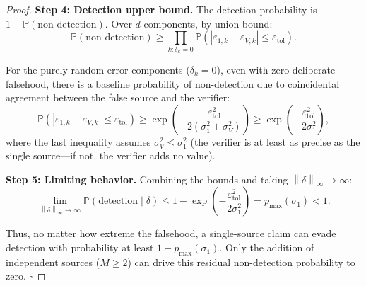 \documentclass[11pt,a4paper]{article}
\theoremstyle{definition}
\newcommand{\Pbb}{\mathbb{P}}
\newcommand{\norm}[1]{\left\lVert#1\right\rVert}
\newcommand{\abs}[1]{\left|#1\right|}
\begin{document}
\begin{proof}
\textbf{Step 4: Detection upper bound.} The detection probability is $1 - \Pbb(\text{non-detection})$. Over $d$ components, by union bound:
\begin{equation}
    \Pbb(\text{non-detection}) \geq \prod_{k: \delta_k = 0} \Pbb(\abs{\varepsilon_{1,k} - \varepsilon_{V,k}} \leq \varepsilon_{\mathrm{tol}}).
    \label{eq:non_detection_product}
\end{equation}

For the purely random error components ($\delta_k = 0$), even with zero deliberate falsehood, there is a baseline probability of non-detection due to coincidental agreement between the false source and the verifier:
\begin{equation}
    \Pbb(\abs{\varepsilon_{1,k} - \varepsilon_{V,k}} \leq \varepsilon_{\mathrm{tol}}) \geq \exp\left(-\frac{\varepsilon_{\mathrm{tol}}^2}{2(\sigma_1^2 + \sigma_V^2)}\right) \geq \exp\left(-\frac{\varepsilon_{\mathrm{tol}}^2}{2\sigma_1^2}\right),
    \label{eq:baseline_agreement}
\end{equation}
where the last inequality assumes $\sigma_V^2 \leq \sigma_1^2$ (the verifier is at least as precise as the single source---if not, the verifier adds no value).

\textbf{Step 5: Limiting behavior.} Combining the bounds and taking $\norm{\delta}_\infty \to \infty$:
\begin{equation}
    \lim_{\norm{\delta}_\infty \to \infty} \Pbb(\text{detection} \mid \delta) \leq 1 - \exp\left(-\frac{\varepsilon_{\mathrm{tol}}^2}{2\sigma_1^2}\right) = p_{\max}(\sigma_1) < 1.
    \label{eq:limiting_detection}
\end{equation}

Thus, no matter how extreme the falsehood, a single-source claim can evade detection with probability at least $1 - p_{\max}(\sigma_1)$. Only the addition of independent sources ($M \geq 2$) can drive this residual non-detection probability to zero. $\square$
\end{proof}
\end{document}

